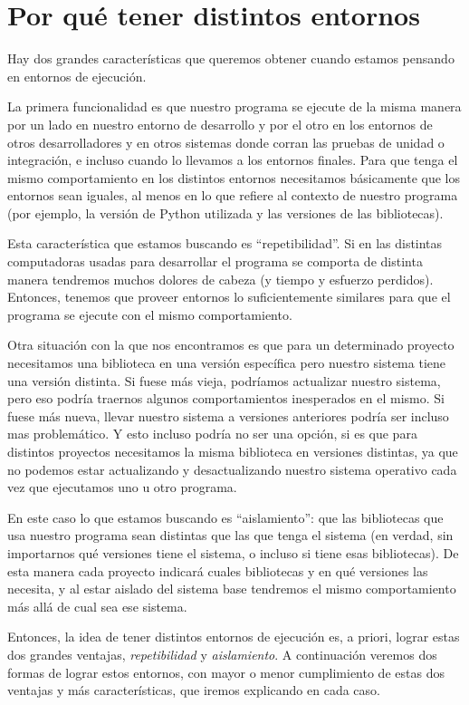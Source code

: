 \section{Por qué tener distintos entornos}

Hay dos grandes características que queremos obtener cuando estamos pensando en entornos de ejecución.

La primera funcionalidad es que nuestro programa se ejecute de la misma manera por un lado en nuestro entorno de desarrollo y por el otro en los entornos de otros desarrolladores y en otros sistemas donde corran las pruebas de unidad o integración, e incluso cuando lo llevamos a los entornos finales. Para que tenga el mismo comportamiento en los distintos entornos necesitamos básicamente que los entornos sean iguales, al menos en lo que refiere al contexto de nuestro programa (por ejemplo, la versión de Python utilizada y las versiones de las bibliotecas).

Esta característica que estamos buscando es ``repetibilidad''. Si en las distintas computadoras usadas para desarrollar el programa se comporta de distinta manera tendremos muchos dolores de cabeza (y tiempo y esfuerzo perdidos). Entonces, tenemos que proveer entornos lo suficientemente similares para que el programa se ejecute con el mismo comportamiento.

Otra situación con la que nos encontramos es que para un determinado proyecto necesitamos una biblioteca en una versión específica pero nuestro sistema tiene una versión distinta. Si fuese más vieja, podríamos actualizar nuestro sistema, pero eso podría traernos algunos comportamientos inesperados en el mismo. Si fuese más nueva, llevar nuestro sistema a versiones anteriores podría ser incluso mas problemático. Y esto incluso podría no ser una opción, si es que para distintos proyectos necesitamos la misma biblioteca en versiones distintas, ya que no podemos estar actualizando y desactualizando nuestro sistema operativo cada vez que ejecutamos uno u otro programa.

En este caso lo que estamos buscando es ``aislamiento'': que las bibliotecas que usa nuestro programa sean distintas que las que tenga el sistema (en verdad, sin importarnos qué versiones tiene el sistema, o incluso si tiene esas bibliotecas). De esta manera cada proyecto indicará cuales bibliotecas y en qué versiones las necesita, y al estar aislado del sistema base tendremos el mismo comportamiento más allá de cual sea ese sistema.

Entonces, la idea de tener distintos entornos de ejecución es, a priori, lograr estas dos grandes ventajas, \textit{repetibilidad} y \textit{aislamiento}. A continuación veremos dos formas de lograr estos entornos, con mayor o menor cumplimiento de estas dos ventajas y más características, que iremos explicando en cada caso. 

